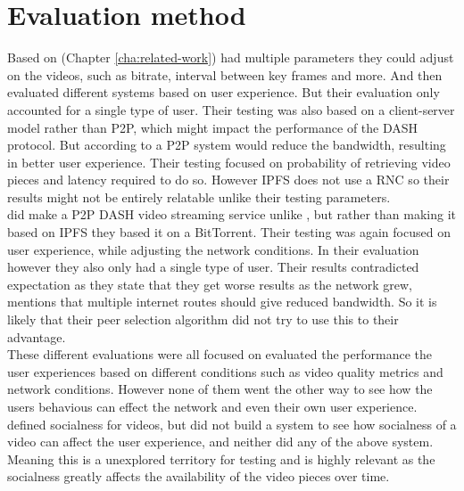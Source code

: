 \section{Evaluation method}
Based on  (Chapter \ref{cha:related-work})
\citeauthor{aloman2015performance} \cite{aloman2015performance} had multiple parameters they could adjust on the videos, such as bitrate, interval between key frames and more. And then evaluated different systems based on user experience. But their evaluation only accounted for a single type of user. Their testing was also based on a client-server model rather than \acs{P2P}, which might impact the performance of the \acs{DASH} protocol. But according to \citeauthor{nguyen2009p2p} a \acs{P2P} system would reduce the bandwidth, resulting in better user experience. Their testing focused on probability of retrieving video pieces and latency required to do so. However \acs{IPFS} does not use a \acs{RNC} so their results might not be entirely relatable unlike their testing parameters.\\
\citeauthor{gazdar2017toward} \cite{gazdar2017toward} did make a \acs{P2P} \acs{DASH} video streaming service unlike \citeauthor{aloman2015performance}, but rather than making it based on \acs{IPFS} they based it on a BitTorrent. Their testing was again focused on user experience, while adjusting the network conditions. In their evaluation however they also only had a single type of user. Their results contradicted expectation as they state that they get worse results as the  network grew, \citeauthor{nguyen2009p2p} mentions that multiple internet routes should give reduced bandwidth. So it is likely that their peer selection algorithm did not try to use this to their advantage.\\
These different evaluations were all focused on evaluated the performance the user experiences based on different conditions such as video quality metrics and network conditions. However none of them went the other way to see how the users behavious can effect the network and even their own user experience.\\
\citeauthor{broxton2013catching} \cite{broxton2013catching} defined socialness for videos, but did not build a system to see how socialness of a video can affect the user experience, and neither did any of the above system. Meaning this is a unexplored territory for testing and is highly relevant as the socialness greatly affects the availability of the video pieces over time.


